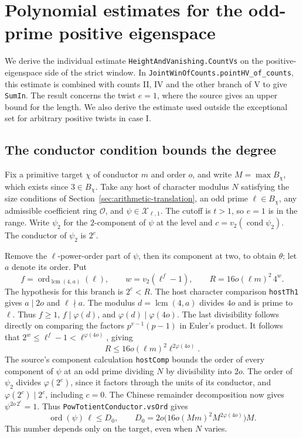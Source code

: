 \section{Polynomial estimates for the odd-prime positive eigenspace}
\label{sec:rh-plus-nonzero}

We derive the individual estimate \texttt{Height\allowbreak{}And\allowbreak{}Vanishing.\allowbreak{}Count\allowbreak{}Vs}
on the positive-eigenspace side of the strict window. In
\texttt{Joint\allowbreak{}Win\allowbreak{}Of\allowbreak{}Counts.\allowbreak{}point\allowbreak{}HV\_\allowbreak{}of\_\allowbreak{}counts}, this estimate is combined
with counts II, IV and the other branch of V to give \texttt{Sum\allowbreak{}In}.
The result concerns the twist \(e=1\), where the source gives an upper
bound for the length. We also derive the estimate used outside the
exceptional set for arbitrary positive twists in case I.

\subsection{The conductor condition bounds the degree}

Fix a primitive target \(\chi\) of conductor \(m\) and order \(o\),
and write \(M=\max B_\chi\), which exists since \(3\in B_\chi\).
Take any host of character modulus \(N\) satisfying the size conditions
of Section~\ref{sec:arithmetic-translation}, an odd prime
\(\ell\in B_\chi\), any admissible coefficient ring \(\mathcal O\), and
\(\psi\in\mathcal X_{\ell,1}\). The cutoff is \(t>1\), so \(e=1\) is
in the range. Write \(\psi_2\) for the \(2\)-component of \(\psi\)
at the level and \(c=v_2(\operatorname{cond}\psi_2)\).
The conductor of \(\psi_2\) is \(2^c\).

Remove the \(\ell\)-power-order part of \(\psi\), then its component
at two, to obtain \(\theta\); let \(a\) denote its order. Put
\[
  f=\operatorname{ord}_{\operatorname{lcm}(4,a)}(\ell),\qquad
  w=v_2(\ell^f-1),\qquad R=16o(\ell m)^2\,4^w.
\]
The hypothesis for this branch is \(2^c<R\). The host character
comparison \texttt{host\allowbreak{}Th1} gives \(a\mid2o\) and \(\ell\nmid a\).
The modulus \(d=\operatorname{lcm}(4,a)\) divides \(4o\) and is
prime to \(\ell\). Thus \(f\ge1\), \(f\mid\varphi(d)\), and
\(\varphi(d)\mid\varphi(4o)\). The last divisibility follows directly
on comparing the factors \(p^{v-1}(p-1)\) in Euler's product.
It follows that \(2^w\le\ell^f-1<\ell^{\varphi(4o)}\), giving
\[
        R\le 16o(\ell m)^2\ell^{2\varphi(4o)}.
\]
The source's component calculation \texttt{host\allowbreak{}Comp} bounds the order
of every component of \(\psi\) at an odd prime dividing \(N\) by
divisibility into \(2o\). The order of \(\psi_2\) divides
\(\varphi(2^c)\), since it factors through the units of its conductor,
and \(\varphi(2^c)\mid 2^c\), including \(c=0\).
The Chinese remainder decomposition now gives \(\psi^{2o\,2^c}=1\).
Thus \texttt{Pow\allowbreak{}Totient\allowbreak{}Conductor.\allowbreak{}vs\allowbreak{}Ord} gives
\[
       \operatorname{ord}(\psi)\,\ell\le
       D_0,\qquad
       D_0=2o\bigl(16o(Mm)^2 M^{2\varphi(4o)}\bigr)M .
\]
This number depends only on the target, even when \(N\) varies.

